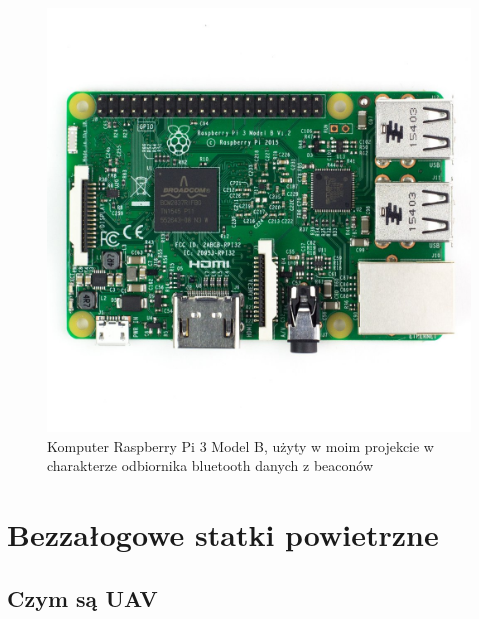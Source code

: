 \begin{figure}[!th]
    \centering
    \includegraphics[width=15cm]{zalaczniki/obrazy/raspberrypi3.jpg}
    \caption{Komputer Raspberry Pi 3 Model B, użyty w moim projekcie w charakterze odbiornika bluetooth danych z beaconów}
    \label{fig:raspberrypi3}
\end{figure}

\section{Bezzałogowe statki powietrzne}

\subsection{Czym są UAV}

